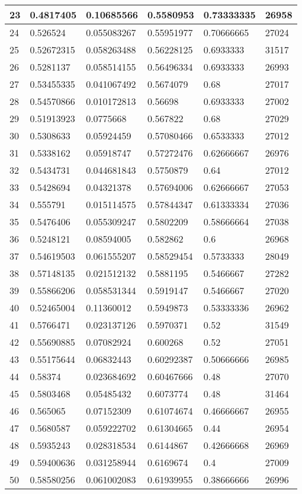 \begin{longtable}{|l|l|l|l|l|l|}
23 & 0.4817405 & 0.10685566 & 0.5580953 & 0.73333335 & 26958 \\ \hline 
24 & 0.526524 & 0.055083267 & 0.55951977 & 0.70666665 & 27024 \\ \hline 
25 & 0.52672315 & 0.058263488 & 0.56228125 & 0.6933333 & 31517 \\ \hline 
26 & 0.5281137 & 0.058514155 & 0.56496334 & 0.6933333 & 26993 \\ \hline 
27 & 0.53455335 & 0.041067492 & 0.5674079 & 0.68 & 27017 \\ \hline 
28 & 0.54570866 & 0.010172813 & 0.56698 & 0.6933333 & 27002 \\ \hline 
29 & 0.51913923 & 0.0775668 & 0.567822 & 0.68 & 27029 \\ \hline 
30 & 0.5308633 & 0.05924459 & 0.57080466 & 0.6533333 & 27012 \\ \hline 
31 & 0.5338162 & 0.05918747 & 0.57272476 & 0.62666667 & 26976 \\ \hline 
32 & 0.5434731 & 0.044681843 & 0.5750879 & 0.64 & 27012 \\ \hline 
33 & 0.5428694 & 0.04321378 & 0.57694006 & 0.62666667 & 27053 \\ \hline 
34 & 0.555791 & 0.015114575 & 0.57844347 & 0.61333334 & 27036 \\ \hline 
35 & 0.5476406 & 0.055309247 & 0.5802209 & 0.58666664 & 27038 \\ \hline 
36 & 0.5248121 & 0.08594005 & 0.582862 & 0.6 & 26968 \\ \hline 
37 & 0.54619503 & 0.061555207 & 0.58529454 & 0.5733333 & 28049 \\ \hline 
38 & 0.57148135 & 0.021512132 & 0.5881195 & 0.5466667 & 27282 \\ \hline 
39 & 0.55866206 & 0.058531344 & 0.5919147 & 0.5466667 & 27020 \\ \hline 
40 & 0.52465004 & 0.11360012 & 0.5949873 & 0.53333336 & 26962 \\ \hline 
41 & 0.5766471 & 0.023137126 & 0.5970371 & 0.52 & 31549 \\ \hline 
42 & 0.55690885 & 0.07082924 & 0.600268 & 0.52 & 27051 \\ \hline 
43 & 0.55175644 & 0.06832443 & 0.60292387 & 0.50666666 & 26985 \\ \hline 
44 & 0.58374 & 0.023684692 & 0.60467666 & 0.48 & 27070 \\ \hline 
45 & 0.5803468 & 0.05485432 & 0.6073774 & 0.48 & 31464 \\ \hline 
46 & 0.565065 & 0.07152309 & 0.61074674 & 0.46666667 & 26955 \\ \hline 
47 & 0.5680587 & 0.059222702 & 0.61304665 & 0.44 & 26954 \\ \hline 
48 & 0.5935243 & 0.028318534 & 0.6144867 & 0.42666668 & 26969 \\ \hline 
49 & 0.59400636 & 0.031258944 & 0.6169674 & 0.4 & 27009 \\ \hline 
50 & 0.58580256 & 0.061002083 & 0.61939955 & 0.38666666 & 26996 \\ \hline 
\end{longtable}